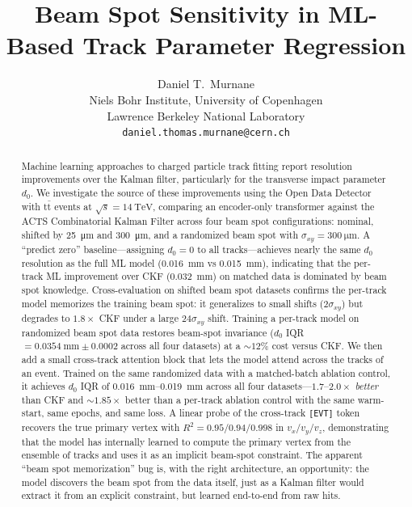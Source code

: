 \documentclass[11pt]{article}
\title{Beam Spot Sensitivity in ML-Based Track Parameter Regression}
\author{
  Daniel T.\ Murnane \\
  Niels Bohr Institute, University of Copenhagen \\
  Lawrence Berkeley National Laboratory \\
  \texttt{daniel.thomas.murnane@cern.ch}
}
\begin{document}
\maketitle

\begin{abstract}
Machine learning approaches to charged particle track fitting report resolution improvements over the Kalman filter, particularly for the transverse impact parameter $d_0$.
We investigate the source of these improvements using the Open Data Detector with $\text{t}\bar{\text{t}}$ events at $\sqrt{s} = \SI{14}{\TeV}$, comparing an encoder-only transformer against the ACTS Combinatorial Kalman Filter across four beam spot configurations: nominal, shifted by \SI{25}{\micro\metre} and \SI{300}{\micro\metre}, and a randomized beam spot with $\sigma_{xy} = \SI{300}{\micro\metre}$.
A ``predict zero'' baseline---assigning $d_0 = 0$ to all tracks---achieves nearly the same $d_0$ resolution as the full ML model (\SI{0.016}{\milli\metre} vs \SI{0.015}{\milli\metre}), indicating that the per-track ML improvement over CKF (\SI{0.032}{\milli\metre}) on matched data is dominated by beam spot knowledge.
Cross-evaluation on shifted beam spot datasets confirms the per-track model memorizes the training beam spot: it generalizes to small shifts ($2\sigma_{xy}$) but degrades to $1.8\times$ CKF under a large $24\sigma_{xy}$ shift.
Training a per-track model on randomized beam spot data restores beam-spot invariance ($d_0$ IQR $= \SI{0.0354}{\milli\metre} \pm 0.0002$ across all four datasets) at a $\sim 12\%$ cost versus CKF.
We then add a small cross-track attention block that lets the model attend across the tracks of an event. Trained on the same randomized data with a matched-batch ablation control, it achieves $d_0$ IQR of \SI{0.016}{\milli\metre}--\SI{0.019}{\milli\metre} across all four datasets---$1.7$--$2.0\times$ \emph{better} than CKF and $\sim 1.85\times$ better than a per-track ablation control with the same warm-start, same epochs, and same loss. A linear probe of the cross-track \texttt{[EVT]} token recovers the true primary vertex with $R^2 = 0.95$/$0.94$/$0.998$ in $v_x$/$v_y$/$v_z$, demonstrating that the model has internally learned to compute the primary vertex from the ensemble of tracks and uses it as an implicit beam-spot constraint. The apparent ``beam spot memorization'' bug is, with the right architecture, an opportunity: the model discovers the beam spot from the data itself, just as a Kalman filter would extract it from an explicit constraint, but learned end-to-end from raw hits.
\end{abstract}
\end{document}
